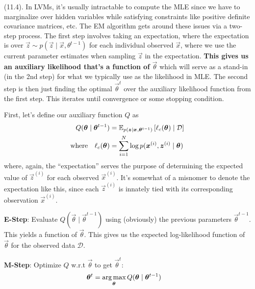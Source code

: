 \documentclass[11pt]{article}
\begin{document}
\myspace
\p {} (11.4). In LVMs, it's usually intractable to compute the MLE since we have to marginalize over hidden variables while satisfying constraints like positive definite covariance matrices, etc. The EM algorithm gets around these issues via a two-step process. The first step involves taking an expectation, where the expectation is over $\vec z \sim p(\vec z \mid \vec x, \theta^{t-1})$ for each individual observed $\vec x$, where we use the current parameter estimates when sampling $\vec z$ in the expectation. \textbf{This gives us an auxiliary likelihood that's a function of $\vec\theta$} which will serve as a stand-in (in the 2nd step) for what we typically use as the likelihood in MLE. The second step is then just finding the optimal $\vec{\theta}^t$ over the auxiliary likelihood function from the first step. This iterates until convergence or some stopping condition.

\begin{algorithm}

First, let's define our auxiliary function $Q$ as
	\begin{align}
		Q(\vec\theta \mid \vec{\theta}^{t-1})
			&= \E[p(\vec z \mid \vec x, \vec{\theta}^{t-1})]{\ell_c(\vec\theta) \mid \mathcal{D}} \\
		\text{where}\quad
		\ell_c(\vec\theta)
			&= \sum_{i=1}^{N} \log p(\vec{x}^{(i)}, \vec{z}^{(i)} \mid \vec\theta)
	\end{align}
	where, again, the ``expectation'' serves the purpose of determining the expected value of $\vec{z}^{(i)}$ for each observed $\vec{x}^{(i)}$. It's somewhat of a misnomer to denote the expectation like this, since each $\vec{z}^{(i)}$ is innately tied with its corresponding observation $\vec{x}^{(i)}$.
	
	\begin{compactenum}
		\item \textbf{E-Step}: Evaluate $Q(\vec\theta \mid \vec{\theta}^{t-1})$ using (obviously) the previous parameters $\vec{\theta}^{t-1}$. This yields a function of $\vec\theta$. This gives us the expected log-likelihood function of $\vec\theta$ for the observed data $\mathcal D$. 
		
		\item \textbf{M-Step}: Optimize $Q$ w.r.t $\vec\theta$ to get $\vec{\theta}^t$:
		\begin{align}
			\vec{\theta}^t 
				&= \argmax_{\vec\theta} Q(\vec\theta \mid \vec{\theta}^{t-1})
		\end{align}
	\end{compactenum}

\end{algorithm}
\end{document}
